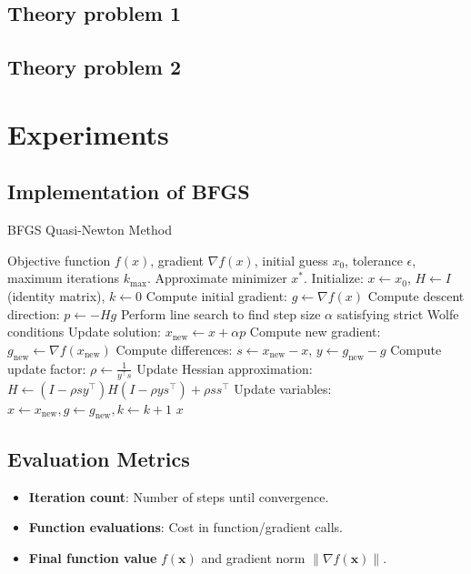 \documentclass[12pt]{article}
\begin{document}
\subsection{Theory problem 1}



\subsection{Theory problem 2}



\section{Experiments}

\subsection{Implementation of BFGS}
\begin{algorithm}
\caption{BFGS Quasi-Newton Method}
\label{alg:BFGS}
\begin{algorithmic}[1]
\Require Objective function $f(x)$, gradient $\nabla f(x)$, initial guess $x_0$, tolerance $\epsilon$, maximum iterations $k_{\max}$.
\Ensure Approximate minimizer $x^*$.
\State Initialize: $x \gets x_0$, $H \gets I$ (identity matrix), $k \gets 0$
\State Compute initial gradient: $g \gets \nabla f(x)$
    \State Compute descent direction: $p \gets - H g$
    \State Perform line search to find step size $\alpha$ satisfying strict Wolfe conditions
    \State Update solution: $x_{\text{new}} \gets x + \alpha p$
    \State Compute new gradient: $g_{\text{new}} \gets \nabla f(x_{\text{new}})$
    \State Compute differences: $s \gets x_{\text{new}} - x$, $y \gets g_{\text{new}} - g$
     
        \State Compute update factor: $\rho \gets \frac{1}{y^\top s}$
        \State Update Hessian approximation:
        \State $H \gets (I - \rho s y^\top) H (I - \rho y s^\top) + \rho s s^\top$
    \EndIf
    \State Update variables: $x \gets x_{\text{new}}, g \gets g_{\text{new}}, k \gets k + 1$
\EndWhile
\State \Return $x$
\end{algorithmic}
\end{algorithm}

\subsection{Evaluation Metrics}
\begin{itemize}
    \item \textbf{Iteration count}: Number of steps until convergence.
    \item \textbf{Function evaluations}: Cost in function/gradient calls.
    \item \textbf{Final function value} \( f(\mathbf{x}) \) and gradient norm \( \|\nabla f(\mathbf{x})\| \).
\end{itemize}
\end{document}
